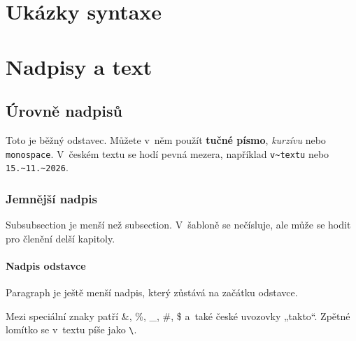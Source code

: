 %
%





\section*{Ukázky syntaxe}


\section{Nadpisy a text}

\subsection{Úrovně nadpisů}

Toto je běžný odstavec. Můžete v~něm použít \textbf{tučné písmo},
\textit{kurzívu} nebo \texttt{monospace}. V~českém textu se hodí
pevná mezera, například \verb|v~textu| nebo \verb|15.~11.~2026|.

\subsubsection{Jemnější nadpis}

Subsubsection je menší než subsection. V~šabloně se nečísluje, ale
může se hodit pro členění delší kapitoly.

\paragraph{Nadpis odstavce} Paragraph je ještě menší nadpis, který
zůstává na začátku odstavce.

Mezi speciální znaky patří \&, \%, \_, \#, \$ a~také české uvozovky
„takto“. Zpětné lomítko se v~textu píše jako \texttt{\textbackslash}.

